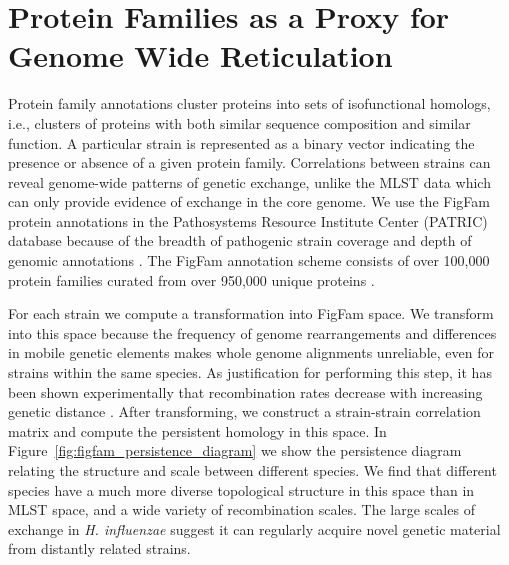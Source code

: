 \section{Protein Families as a Proxy for Genome Wide Reticulation}
\label{sec:patric_analysis}

Protein family annotations cluster proteins into sets of isofunctional homologs, i.e., clusters of proteins with both similar sequence composition and similar function.
A particular strain is represented as a binary vector indicating the presence or absence of a given protein family.
Correlations between strains can reveal genome-wide patterns of genetic exchange, unlike the MLST data which can only provide evidence of exchange in the core genome.
We use the FigFam protein annotations in the Pathosystems Resource Institute Center (PATRIC) database because of the breadth of pathogenic strain coverage and depth of genomic annotations \cite{Wattam:2013jy}.
The FigFam annotation scheme consists of over 100,000 protein families curated from over 950,000 unique proteins \cite{Meyer:2009iq}.

For each strain we compute a transformation into FigFam space.
We transform into this space because the frequency of genome rearrangements and differences in mobile genetic elements makes whole genome alignments unreliable, even for strains within the same species.
As justification for performing this step, it has been shown experimentally that recombination rates decrease with increasing genetic distance \cite{Fraser:2007ep}.
After transforming, we construct a strain-strain correlation matrix and compute the persistent homology in this space.
In Figure~\ref{fig:figfam_persistence_diagram} we show the persistence diagram relating the structure and scale between different species.
We find that different species have a much more diverse topological structure in this space than in MLST space, and a wide variety of recombination scales.
The large scales of exchange in \emph{H. influenzae} suggest it can regularly acquire novel genetic material from distantly related strains.

